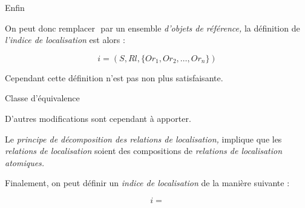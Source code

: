 Enfin

On peut donc remplacer \(\) par un ensemble \emph{d'objets de
  référence,} la définition de \emph{l'indice de localisation} est
alors :

\begin{equation}
  i = (S, Rl, \{Or_1, Or_2, \ldots, Or_n\})
\end{equation}

Cependant cette définition n'est pas non plus satisfaisante.

Classe d'équivalence


D'autres modifications sont cependant à apporter.

Le \emph{principe de décomposition des relations de localisation,}
implique que les \emph{relations de localisation} soient des
compositions de \emph{relations de localisation atomiques.}



Finalement, on peut définir un \emph{indice de localisation} de la
manière suivante :

\begin{equation}
  i =
\end{equation}

